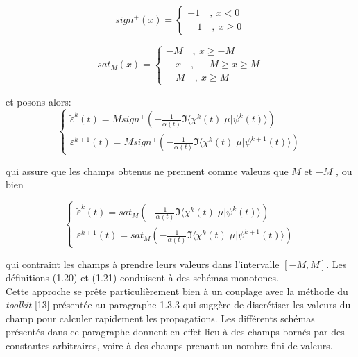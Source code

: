 \begin{equation}
sign^+(x) = \begin{cases}
-1 \quad,\ x< 0\\
\quad 1 \quad,\ x \geq 0
\end{cases}
\end{equation}

\begin{equation}
sat_M(x) = \begin{cases}
-M \quad,\ x\geq -M\\
\quad x\quad,\ -M\geq x \geq M\\
\quad M \quad,\ x\geq M 
\end{cases}
\end{equation}

\noindent et posons alors:
\begin{equation}
\begin{cases}
\tilde{\varepsilon}^k(t) = Msign^+ \left(-\frac{1}{\alpha(t)} \Im\langle \chi^k(t)|\mu|\psi^k(t)\rangle\right)\\
\varepsilon^{k+1}(t) = Msign^+ \left(-\frac{1}{\alpha(t)} \Im\langle \chi^k(t)|\mu|\psi^{k+1}(t)\rangle\right)
\end{cases}
\end{equation}

\noindent qui assure que les champs obtenus ne prennent comme valeurs que $M$ et $-M$ , ou bien

\begin{equation}
\begin{cases}
\tilde{\varepsilon}^k(t) = sat_M \left(-\frac{1}{\alpha(t)} \Im\langle \chi^k(t)|\mu|\psi^k(t)\rangle\right)\\
\varepsilon^{k+1}(t) = sat_M \left(-\frac{1}{\alpha(t)} \Im\langle \chi^k(t)|\mu|\psi^{k+1}(t)\rangle\right)
\end{cases}
\end{equation}

qui contraint les champs à prendre leurs valeurs dans l'intervalle $[-M, M ]$. Les définitions (1.20) et (1.21) conduisent à des schémas monotones.
\\Cette approche se prête particulièrement bien à un couplage avec la méthode du \textit{toolkit} [13] présentée au paragraphe 1.3.3 qui suggère de discrétiser les valeurs du champ pour calculer rapidement les propagations. Les différents schémas présentés dans ce paragraphe donnent en effet lieu à des champs bornés par des constantes arbitraires, voire à des champs prenant un nombre fini de valeurs.

